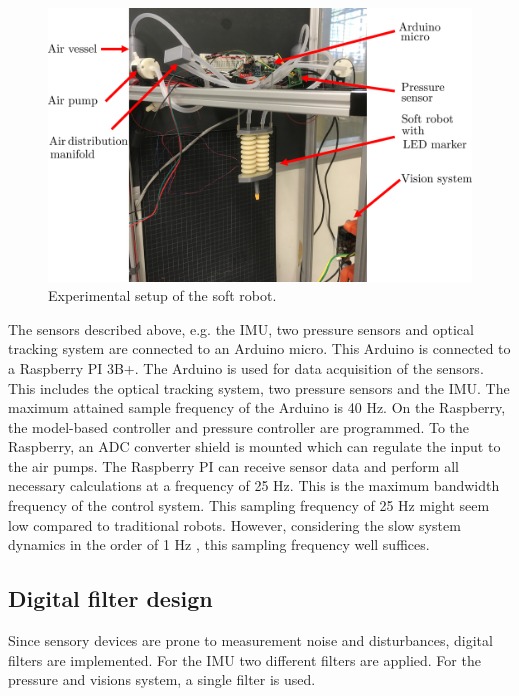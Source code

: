 \begin{figure}[H]
    \centering
    \includegraphics[width = \textwidth]{Figures/Chapter5/expsetup.png}
    \caption{Experimental setup of the soft robot.}
    \label{fig5:setup}
\end{figure}


The sensors described above, e.g. the IMU, two pressure sensors and optical tracking system are connected to an Arduino micro. This Arduino is connected to a Raspberry PI 3B+. The Arduino is used for data acquisition of the sensors. This includes the optical tracking system, two pressure sensors and the IMU. The maximum attained sample frequency of the Arduino is 40 Hz. On the Raspberry, the model-based controller and pressure controller are programmed. To the Raspberry, an ADC converter shield is mounted which can regulate the input to the air pumps. The Raspberry PI can receive sensor data and perform all necessary calculations at a frequency of 25 Hz. This is the maximum bandwidth frequency of the control system. This sampling frequency of 25 Hz might seem low compared to traditional robots. However, considering the slow system dynamics in the order of 1 Hz \cite{tawk2018bioinspired},\cite{HighBandwidthControl} this sampling frequency well suffices.


\subsection*{Digital filter design}

Since sensory devices are prone to measurement noise and disturbances, digital filters are implemented. For the IMU two different filters are applied. For the pressure and visions system, a single filter is used. 

